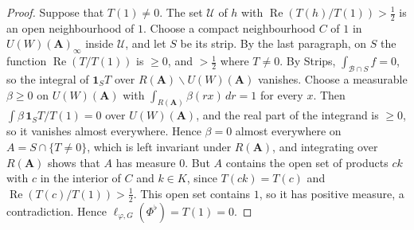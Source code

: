 \begin{proof}
Suppose that $T(1)\neq0$. The set $\mathcal U$ of $h$ with
$\operatorname{Re}(T(h)/T(1))>\tfrac12$ is an open neighbourhood of $1$. Choose
a compact neighbourhood $C$ of $1$ in $U(W)(\mathbf A)_\infty$ inside
$\mathcal U$, and
let $S$ be its strip. By the last paragraph, on $S$ the function
$\operatorname{Re}(T/T(1))$ is $\geq0$, and $>\tfrac12$ where $T\neq0$. By
Strips, $\int_{\mathcal B\cap S}f=0$, so the integral of $\mathbf 1_ST$ over
$R(\mathbf A)\backslash U(W)(\mathbf A)$ vanishes. Choose a measurable
$\beta\geq0$ on $U(W)(\mathbf A)$ with $\int_{R(\mathbf A)}\beta(rx)\,dr=1$
for every $x$. Then $\int\beta\,\mathbf 1_ST/T(1)=0$ over $U(W)(\mathbf A)$,
and the real part of the integrand is $\geq0$, so it vanishes almost
everywhere. Hence $\beta=0$ almost everywhere on $A=S\cap\{T\neq0\}$, which is
left invariant under $R(\mathbf A)$, and integrating over $R(\mathbf A)$ shows
that $A$ has measure $0$. But $A$ contains the open set of products $ck$ with
$c$ in the interior of $C$ and $k\in K$, since $T(ck)=T(c)$ and
$\operatorname{Re}(T(c)/T(1))>\tfrac12$. This open set contains $1$, so it has
positive measure, a contradiction. Hence
$\ell_{\varphi,G}(\Phi^\flat)=T(1)=0$.
\end{proof}

